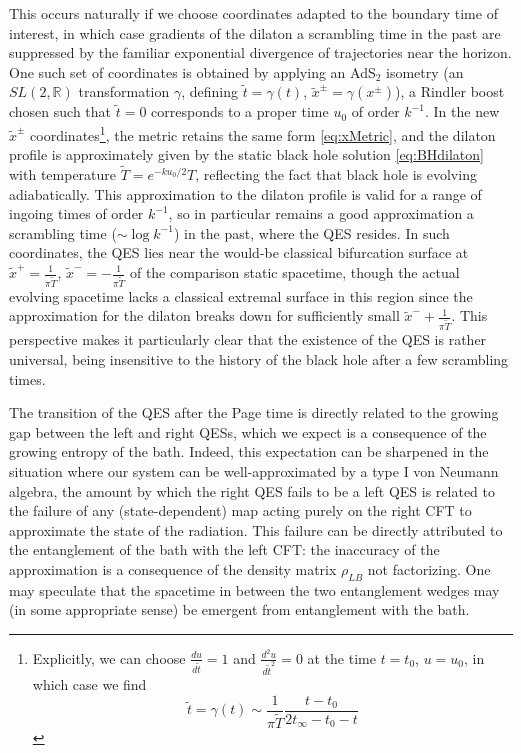 \documentclass[12pt]{article}
\newcommand{\RR}{\mathbb{R}}
\begin{document}
This occurs naturally if we choose coordinates adapted to the boundary time of interest, in which case gradients of the dilaton a scrambling time in the past are suppressed by the familiar exponential divergence of trajectories near the horizon. One such set of coordinates is obtained by applying an AdS$_2$ isometry (an $SL(2,\RR)$ transformation $\gamma$, defining $\tilde{t}=\gamma(t)$, $\tilde{x}^\pm=\gamma(x^\pm)$), a Rindler boost chosen such that $\tilde{t}=0$ corresponds to a proper time $u_0$ of order $k^{-1}$. In the new $\tilde{x}^\pm$ coordinates\footnote{Explicitly, we can choose $\frac{du}{d\tilde{t}}=1$ and $\frac{d^2u}{d\tilde{t}^2}=0$ at the time $t=t_0$, $u=u_0$, in which case we find \begin{equation*}
	\tilde{t}=\gamma(t)\sim \frac{1}{\pi \tilde{T}} \frac{t-t_0}{2t_\infty-t_0-t}
\end{equation*}}, the metric retains the same form \eqref{eq:xMetric}, and the dilaton profile is approximately given by the static black hole solution \eqref{eq:BHdilaton} with temperature $\tilde{T} = e^{-k u_0/2}T$, reflecting the fact that black hole is evolving adiabatically. This approximation to the dilaton profile is valid for a range of ingoing times of order $k^{-1}$, so in particular remains a good approximation a scrambling time ($\sim\log k^{-1}$) in the past, where the QES resides. In such coordinates, the QES lies near the would-be classical bifurcation surface at $\tilde{x}^+=\frac{1}{\pi\tilde{T}}$, $\tilde{x}^-=-\frac{1}{\pi\tilde{T}}$ of the comparison static spacetime, though the actual evolving spacetime lacks a classical extremal surface in this region since the approximation for the dilaton breaks down for sufficiently small $\tilde{x}^-+\frac{1}{\pi\tilde{T}}$. This perspective makes it particularly clear that the existence of the QES is rather universal, being insensitive to the history of the black hole after a few scrambling times.

The transition of the QES after the Page time is directly related to the growing gap between the left and right QESs, which we expect is a consequence of the growing entropy of the bath. Indeed, this expectation can be sharpened in the situation where our system can be well-approximated by a type I von Neumann algebra, the amount by which the right QES fails to be a left QES is related to the failure of any (state-dependent) map acting purely on the right CFT to approximate the state of the radiation. This failure can be directly attributed to the entanglement of the bath with the left CFT: the inaccuracy of the approximation is a consequence of the density matrix $\rho_{LB}$ not factorizing. One may speculate that the spacetime in between the two entanglement wedges may (in some appropriate sense) be emergent from entanglement with the bath.
\end{document}

